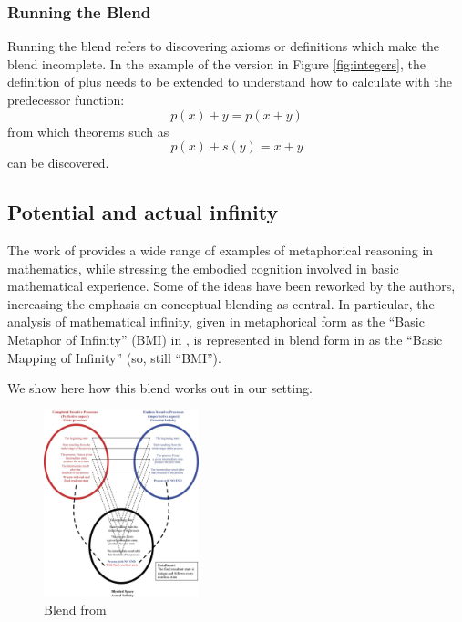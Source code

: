\subsubsection{Running the Blend}

Running the blend refers to discovering axioms or definitions which
make the blend incomplete. In the example of the version in Figure
\ref{fig:integers}, the definition of plus needs to be extended to
understand how to calculate with the predecessor function:
$$
p(x) + y = p(x+y)
$$
\noindent from which theorems such as 
$$
p(x) + s(y) = x+y
$$
\noindent can be discovered.


\subsection{Potential and actual infinity}

The work of \textcite{Lak00} provides a wide range of examples of
metaphorical reasoning in mathematics, while stressing the embodied
cognition involved in basic mathematical experience.  Some of
the ideas have been reworked by the authors, increasing the emphasis on
conceptual blending as central.  In particular, the analysis of
mathematical infinity, given in metaphorical form as the ``Basic Metaphor
of Infinity'' (BMI) in \textcite{Lak00}, is represented in blend form
in \textcite{nunez05} as the ``Basic Mapping of Infinity'' (so, still ``BMI'').

We show here how this blend works out in our setting.

\begin{figure}[h]
  \centering
\includegraphics[width=0.4\textwidth]{transfin_nunez}  
  \caption{Blend from \textcite[p ??]{nunez05}}
  \label{fig:nunez_transfin}
\end{figure}

